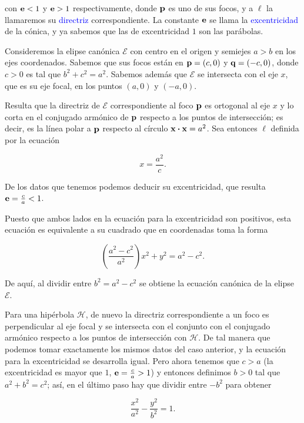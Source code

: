 \documentclass{article}
\theoremstyle{definicion}
\theoremstyle{definition}             %
\theoremstyle{definition}             %
\theoremstyle{definition}
\theoremstyle{definition}
\theoremstyle{observacion}
\theoremstyle{definition}
\theoremstyle{plain}
\theoremstyle{definition}
\theoremstyle{afirmacion}
\theoremstyle{notation}
\theoremstyle{definition}
\begin{document}
    con \(\vb{e} < 1\) y \(\vb{e} > 1\) respectivamente, donde \(\vb{p}\) es uno de sus focos, y a \(\ell\) la llamaremos su \textcolor{blue}{directriz} correspondiente. La constante \(\vb{e}\) se llama la \textcolor{blue}{excentricidad} de la cónica, y ya sabemos que las de excentricidad \(1\) son las parábolas.

    Consideremos la elipse canónica \(\mathcal{E}\) con centro en el origen y semiejes \(a > b\) en los ejes coordenados. Sabemos que sus focos están en \(\vb{p} = (c, 0)\) y \(\vb{q} = (-c, 0)\), donde \(c > 0\) es tal que \(b^{2} + c^{2} = a^{2}\). Sabemos además que \(\mathcal{E}\) se intersecta con el eje \(x\), que es su eje focal, en los puntos \((a, 0)\) y \((-a, 0)\).

    Resulta que la directriz de \(\mathcal{E}\) correspondiente al foco \(\vb{p}\) es ortogonal al eje \(x\) y lo corta en el conjugado armónico de \(\vb{p}\) respecto a los puntos de intersección; es decir, es la línea polar a \(\vb{p}\) respecto al círculo \(\vb{x} \vdot \vb{x} = a^{2}\). Sea entonces \(\ell\) definida por la ecuación

    \begin{equation*}
        x =  \dfrac{a^{2}}{c}.
    \end{equation*}

    De los datos que tenemos podemos deducir su excentricidad, que resulta \(\vb{e} = \frac{c}{a} < 1\).

    Puesto que ambos lados en la ecuación para la excentricidad son positivos, esta ecuación es equivalente a su cuadrado que en coordenadas toma la forma

    \begin{equation*}
        \left(\dfrac{a^{2} - c^{2}}{a^{2}}\right)x^{2} + y^{2} = a^{2} - c^{2}.
    \end{equation*}

    De aquí, al dividir entre \(b^{2} = a^{2} - c^{2}\) se obtiene la ecuación canónica de la elipse \(\mathcal{E}\).

    Para una hipérbola \(\mathcal{H}\), de nuevo la directriz correspondiente a un foco es perpendicular al eje focal y se intersecta con el conjunto con el conjugado armónico respecto a los puntos de intersección con \(\mathcal{H}\). De tal manera que podemos tomar exactamente los mismos datos del caso anterior, y la ecuación para la excentricidad se desarrolla igual. Pero ahora tenemos que \(c > a\) (la excentricidad es mayor que \(1\), \(\vb{e} = \frac{c}{a} > 1\)) y entonces definimos \(b > 0\) tal que \(a^{2} + b^{2} = c^{2}\); así, en el último paso hay que dividir entre \(-b^{2}\) para obtener

    \begin{equation*}
        \dfrac{x^{2}}{a^{2}} - \dfrac{y^{2}}{b^{2}} = 1.
    \end{equation*}
\end{document}

